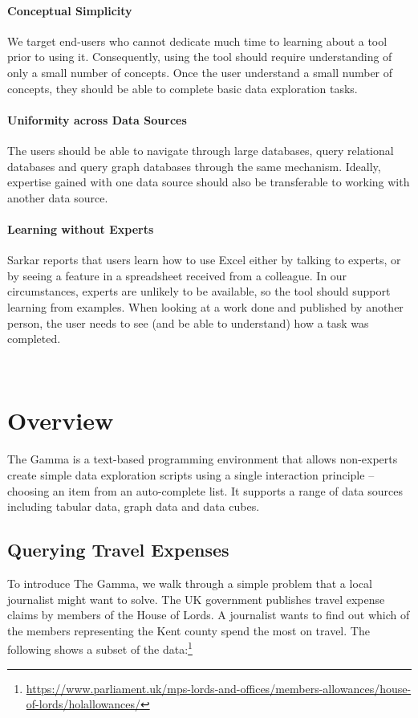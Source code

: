 \documentclass{sigchi}
\newcommand{\tg}{The Gamma\xspace}
\begin{document}
\paragraph{Conceptual Simplicity}
We target end-users who cannot dedicate much time to learning about a tool prior
to using it. Consequently, using the tool should require understanding of only a small number
of concepts. Once the user understand a small number of concepts, they should be able to complete
basic data exploration tasks.

\paragraph{Uniformity across Data Sources}
The users should be able to navigate through large databases, query relational databases and
query graph databases through the same mechanism. Ideally, expertise gained with one data source
should also be transferable to working with another data source.

\paragraph{Learning without Experts}
Sarkar \cite{learning} reports that users learn how to use Excel either by talking to experts,
or by seeing a feature in a spreadsheet received from a colleague. In our circumstances, experts
are unlikely to be available, so the tool should support learning from examples. When looking at
a work done and published by another person, the user needs to see (and be able to understand)
how a task was completed.

\newpage
~
\newpage


\section{Overview}
\label{sec:overview}

\tg is a text-based programming environment that allows non-experts create simple data exploration
scripts using a single interaction principle -- choosing an item from an auto-complete list.
It supports a range of data sources including tabular data, graph data and data cubes.

\subsection{Querying Travel Expenses}
To introduce \tg, we walk through a simple problem that a local journalist might want to solve.
The UK government publishes travel expense claims by members of the House of Lords. A journalist
wants to find out which of the members representing the Kent county spend the most on travel.
The following shows a subset of the data:\footnote{ \url{https://www.parliament.uk/mps-lords-and-offices/members-allowances/house-of-lords/holallowances/} }
\end{document}
